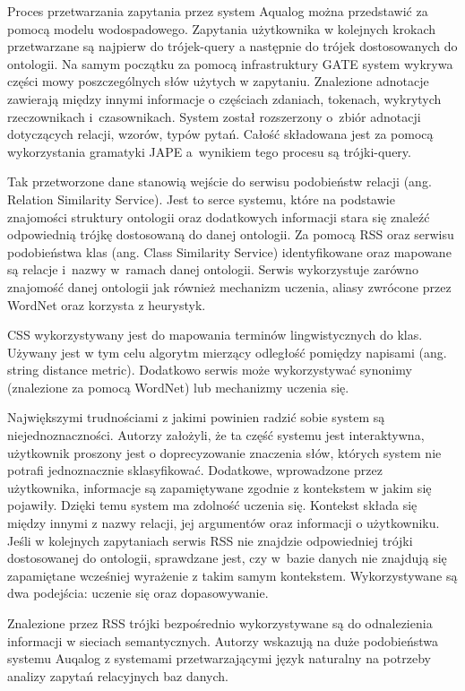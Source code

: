 Proces przetwarzania zapytania przez system Aqualog można przedstawić za pomocą modelu wodospadowego. Zapytania użytkownika w kolejnych krokach przetwarzane są najpierw do trójek-query a następnie do trójek dostosowanych do ontologii. Na samym początku za pomocą infrastruktury GATE system wykrywa części mowy poszczególnych słów użytych w zapytaniu. Znalezione adnotacje zawierają między innymi informacje o częściach zdaniach, tokenach, wykrytych rzeczownikach i~czasownikach. System został rozszerzony o~zbiór adnotacji dotyczących relacji, wzorów, typów pytań. Całość składowana jest za pomocą wykorzystania gramatyki JAPE a~wynikiem tego procesu są trójki-query.

Tak przetworzone dane stanowią wejście do serwisu podobieństw relacji (ang. Relation Similarity Service). Jest to serce systemu, które na podstawie znajomości struktury ontologii oraz dodatkowych informacji stara się znaleźć odpowiednią trójkę dostosowaną do danej ontologii. Za pomocą RSS oraz serwisu podobieństwa klas (ang. Class Similarity Service) identyfikowane oraz mapowane są relacje i~nazwy w~ramach danej ontologii. Serwis wykorzystuje zarówno znajomość danej ontologii jak również mechanizm uczenia, aliasy zwrócone przez WordNet oraz korzysta z heurystyk.

CSS wykorzystywany jest do mapowania terminów lingwistycznych do klas. Używany jest w tym celu algorytm mierzący odległość pomiędzy napisami (ang. string distance metric). Dodatkowo serwis może wykorzystywać synonimy (znalezione za pomocą WordNet) lub mechanizmy uczenia się. 

Największymi trudnościami z jakimi powinien radzić sobie system są niejednoznaczności. Autorzy założyli, że ta część systemu jest interaktywna, użytkownik proszony jest o doprecyzowanie znaczenia słów, których system nie potrafi jednoznacznie sklasyfikować. Dodatkowe, wprowadzone przez użytkownika, informacje są zapamiętywane zgodnie z kontekstem w jakim się pojawiły. Dzięki temu system ma zdolność uczenia się. Kontekst składa się między innymi z nazwy relacji, jej argumentów oraz informacji o użytkowniku. Jeśli w kolejnych zapytaniach serwis RSS nie znajdzie odpowiedniej trójki dostosowanej do ontologii, sprawdzane jest, czy w~bazie danych nie znajdują się zapamiętane wcześniej wyrażenie z takim samym kontekstem. Wykorzystywane są dwa podejścia: uczenie się oraz dopasowywanie.

Znalezione przez RSS trójki bezpośrednio wykorzystywane są do odnalezienia informacji w sieciach semantycznych. Autorzy wskazują na duże podobieństwa systemu Auqalog z systemami przetwarzającymi język naturalny na potrzeby analizy zapytań relacyjnych baz danych\cite{lopez2005aqualog}.

